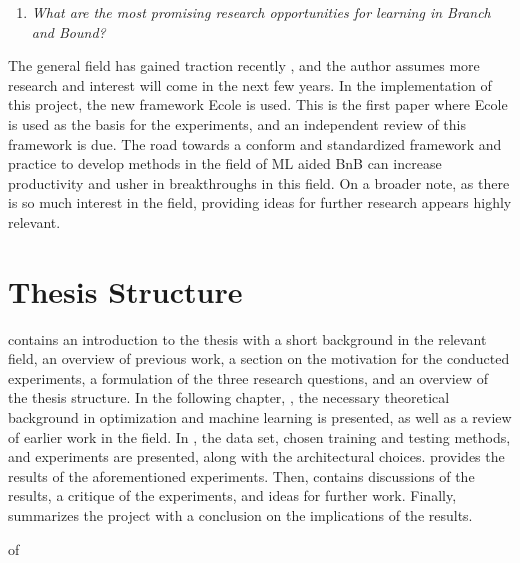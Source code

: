 %
\begin{enumerate}[resume*]
    \item \textit{What are the most promising research opportunities for learning in Branch and Bound?}
\end{enumerate}
%
The general field has gained traction recently \cite{bengio2020machine}, and the author assumes more research and interest will come in the next few years. In the implementation of this project, the new framework \gls{Ecole} is used. This is the first paper where \gls{Ecole} is used as the basis for the experiments, and an independent review of this framework is due. The road towards a conform and standardized framework and practice to develop methods in the field of \gls{ML} aided \Gls{BnB} can increase productivity and usher in breakthroughs in this field. On a broader note, as there is so much interest in the field, providing ideas for further research appears highly relevant. 



\section{Thesis Structure}\label{sec:structure}


 contains an introduction to the thesis with a short background in the relevant field, an overview of previous work, a section on the motivation for the conducted experiments, a formulation of the three research questions, and an overview of the thesis structure. 
In the following chapter, , the necessary theoretical background in optimization and machine learning is presented, as well as a review of earlier work in the field. In , the data set, chosen training and testing methods, and experiments are presented, along with the architectural choices.  provides the results of the aforementioned experiments. Then,  contains discussions of the results, a critique of the experiments, and ideas for further work. Finally,  summarizes the project with a conclusion on the implications of the results. 


of 